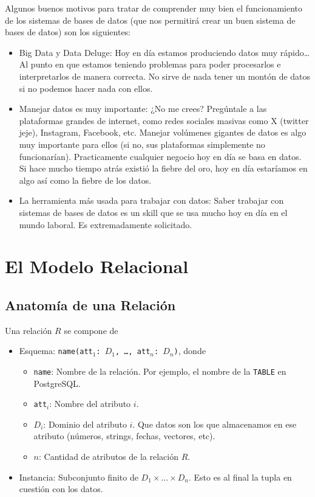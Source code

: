 Algunos buenos motivos para tratar de comprender muy bien el funcionamiento de los sistemas de bases de datos (que nos permitirá crear un buen sistema de bases de datos) son los siguientes:
\begin{itemize}
  \item Big Data y Data Deluge: Hoy en día estamos produciendo datos muy rápido\dots Al punto en que estamos teniendo problemas para poder procesarlos e interpretarlos de manera correcta. No sirve de nada tener un montón de datos si no podemos hacer nada con ellos.
  \item Manejar datos es muy importante: ¿No me crees? Pregúntale a las plataformas grandes de internet, como redes sociales masivas como X (twitter jeje), Instagram, Facebook, etc. Manejar volúmenes gigantes de datos es algo muy importante para ellos (si no, sus plataformas simplemente no funcionarían). Practicamente cualquier negocio hoy en día se basa en datos. Si hace mucho tiempo atrás existió la fiebre del oro, hoy en día estaríamos en algo así como la fiebre de los datos.
  \item La herramienta más usada para trabajar con datos: Saber trabajar con sistemas de bases de datos es un skill que se usa mucho hoy en día en el mundo laboral. Es extremadamente solicitado.
\end{itemize}


\section{El Modelo Relacional}
\subsection{Anatomía de una Relación}
Una relación $R$ se compone de
\begin{itemize}
  \item Esquema: \texttt{name(att$_1$: $D_1$, \ldots, att$_n$: $D_n$)}, donde
  \begin{itemize}
    \item \texttt{name}: Nombre de la relación. Por ejemplo, el nombre de la \texttt{TABLE} en PostgreSQL.
    \item \texttt{att$_i$}: Nombre del atributo $i$.
    \item $D_i$: Dominio del atributo $i$. Que datos son los que almacenamos en ese atributo (números, strings, fechas, vectores, etc).
    \item $n$: Cantidad de atributos de la relación $R$.
  \end{itemize}
  \item Instancia: Subconjunto finito de $D_1 \times \ldots \times D_n$. Esto es al final la tupla en cuestión con los datos.
\end{itemize}

